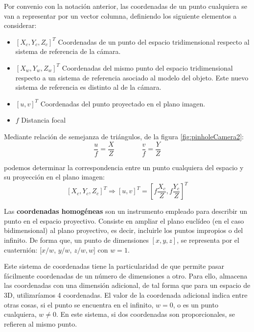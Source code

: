 Por convenio con la notación anterior, las coordenadas de un punto cualquiera se van a representar por un vector columna, definiendo los siguiente elementos a considerar:
\begin{itemize}
\item $[X_c , Y_c , Z_c ]^T$ Coordenadas de un punto del espacio tridimensional respecto al sistema de referencia de la cámara.
\item $[X_w , Y_w , Z_w ]^T$ Coordenadas del mismo punto del espacio tridimensional respecto a un sistema de referencia asociado al modelo del objeto. Este nuevo sistema de referencia es distinto al de la cámara.
\item $[u, v]^T$  Coordenadas del punto proyectado en el plano imagen.
\item $f$  Distancia focal
\end{itemize}

Mediante relación de semejanza de triángulos, de la figura \ref{fig:pinholeCamera2}: 
\begin{equation}\label{eq:semejanza}
  \dfrac{u}{f} = \dfrac{X}{Z} \quad \quad \quad \quad \dfrac{v}{f} = \dfrac{Y}{Z} 
\end{equation}

podemos determinar la correspondencia entre un punto cualquiera del espacio y su proyección en el plano imagen:
\begin{equation}\label{eq:proyeccion}
  [X_c , Y_c , Z_c ]^T \Longrightarrow  [u, v]^T = [f \dfrac{X_c}{Z}, f \dfrac{Y_c}{Z}]^T
\end{equation}

Las \textbf{coordenadas homogéneas} son un instrumento empleado para describir un punto en el espacio proyectivo. Consiste en ampliar el plano euclídeo (en el caso bidimensional) al plano proyectivo, es decir, incluirle los puntos impropios o del infinito. De forma que, un punto de dimensiones $[x, y, z]$, se representa por el cuaternión: $[x/w$, $y/w$, $z/w, w]$ con $w=1$. %

Este sistema de coordenadas tiene la particularidad de que permite pasar fácilmente coordenadas de un número de dimensiones a otro. Para ello, almacena las coordenadas con una dimensión adicional, de tal forma que para un espacio de 3D, utilizaríamos 4 coordenadas. El valor de la coordenada adicional indica entre otras cosas, si el punto se encuentra en el infinito, $w=0$, o es un punto cualquiera, $w \neq 0$. En este sistema, si dos coordenadas son proporcionales, se refieren al mismo punto.

